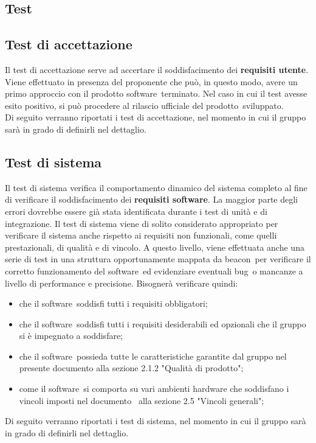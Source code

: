 \documentclass[../PianoDiQualifica.tex]{subfiles}
\begin{document}
\begin{appendices}

\section{Test}
	\subsection{Test di accettazione}
	Il test di accettazione serve ad accertare il soddisfacimento dei \textbf{requisiti utente}. Viene effettuato in presenza del proponente che può, in questo modo, avere un primo approccio con il prodotto software\g\ terminato. Nel caso in cui il test avesse esito positivo, si può procedere al rilascio ufficiale del prodotto\g\ 
sviluppato.\\
	Di seguito verranno riportati i test di accettazione, nel momento in cui il gruppo sarà in grado di definirli nel dettaglio.
	\subsection{Test di sistema}
	Il test di sistema verifica il comportamento dinamico del sistema completo al fine di verificare il soddisfacimento dei \textbf{requisiti software}. La maggior parte degli errori dovrebbe essere già stata identificata durante i test di unità e di integrazione. Il test di sistema viene di solito considerato appropriato per verificare il sistema anche rispetto ai requisiti non funzionali, come quelli prestazionali, di qualità e di vincolo. A questo livello, viene effettuata anche una serie di test in una struttura opportunamente mappata da beacon\g\ per verificare il corretto funzionamento del software\g\ ed evidenziare eventuali bug\g\ o mancanze a livello di performance e precisione. Bisognerà verificare quindi:
	\begin{itemize}
		\item che il software\g\ soddisfi tutti i requisiti obbligatori;
		\item che il software\g\ soddisfi tutti i requisiti desiderabili ed opzionali che il gruppo si è impegnato a soddisfare;
		\item che il software\g\ possieda tutte le caratteristiche garantite dal gruppo nel presente documento alla sezione 2.1.2 "Qualità di prodotto";
		\item come il software\g\ si comporta su vari ambienti hardware che soddisfano i vincoli imposti nel documento \analisideirequisiti\ alla sezione 2.5 "Vincoli generali";
	\end{itemize}
	Di seguito verranno riportati i test di sistema, nel momento in cui il gruppo sarà in grado di definirli nel dettaglio.
\end{appendices}
\end{document}
